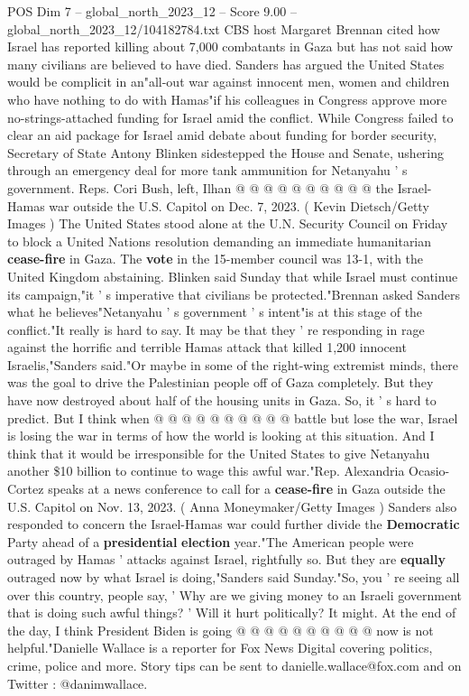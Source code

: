 \begin{textsample}{POS Dim 7 – global\_north\_2023\_12 – Score 9.00 – global\_north\_2023\_12/104182784.txt}
CBS host Margaret Brennan cited how Israel has reported killing about 7,000 combatants in Gaza but has not said how many civilians are believed to have died.
Sanders has argued the United States would be complicit in an"all-out war against innocent men, women and children who have nothing to do with Hamas"if his colleagues in Congress approve more no-strings-attached funding for Israel amid the conflict.
While Congress failed to clear an aid package for Israel amid debate about funding for border security, Secretary of State Antony Blinken sidestepped the House and Senate, ushering through an emergency deal for more tank ammunition for Netanyahu ' s government.
Reps.
Cori Bush, left, Ilhan @ @ @ @ @ @ @ @ @ @ the Israel-Hamas war outside the U.S.
Capitol on Dec. 7, 2023. ( Kevin Dietsch/Getty Images ) The United States stood alone at the U.N.
Security Council on Friday to block a United Nations resolution demanding an immediate humanitarian \textbf{cease-fire} in Gaza.
The \textbf{vote} in the 15-member council was 13-1, with the United Kingdom abstaining.
Blinken said Sunday that while Israel must continue its campaign,"it ' s imperative that civilians be protected."Brennan asked Sanders what he believes"Netanyahu ' s government ' s intent"is at this stage of the conflict."It really is hard to say.
It may be that they ' re responding in rage against the horrific and terrible Hamas attack that killed 1,200 innocent Israelis,"Sanders said."Or maybe in some of the right-wing extremist minds, there was the goal to drive the Palestinian people off of Gaza completely.
But they have now destroyed about half of the housing units in Gaza.
So, it ' s hard to predict.
But I think when @ @ @ @ @ @ @ @ @ @ battle but lose the war, Israel is losing the war in terms of how the world is looking at this situation.
And I think that it would be irresponsible for the United States to give Netanyahu another \$10 billion to continue to wage this awful war."Rep.
Alexandria Ocasio-Cortez speaks at a news conference to call for a \textbf{cease-fire} in Gaza outside the U.S.
Capitol on Nov. 13, 2023. ( Anna Moneymaker/Getty Images ) Sanders also responded to concern the Israel-Hamas war could further divide the \textbf{Democratic} Party ahead of a \textbf{presidential} \textbf{election} year."The American people were outraged by Hamas ' attacks against Israel, rightfully so.
But they are \textbf{equally} outraged now by what Israel is doing,"Sanders said Sunday."So, you ' re seeing all over this country, people say, ' Why are we giving money to an Israeli government that is doing such awful things? ' Will it hurt politically?
It might.
At the end of the day, I think President Biden is going @ @ @ @ @ @ @ @ @ @ now is not helpful."Danielle Wallace is a reporter for Fox News Digital covering politics, crime, police and more.
Story tips can be sent to danielle.wallace@fox.com and on Twitter : @danimwallace.

\end{textsample}
